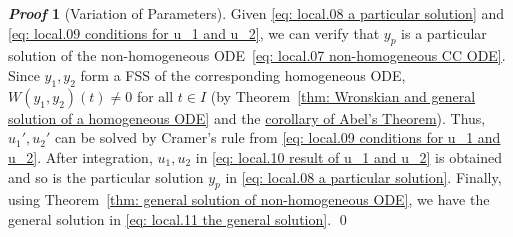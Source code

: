 \documentclass[10pt,UTF8]{article}
\theoremstyle{definition}
\newtheorem{definition inner}{Definition}[section]
\theoremstyle{definition}
\newtheorem{theorem inner}{Theorem}[section]
\theoremstyle{definition}
\newtheorem*{proof inner}{\textit{Proof}}
\renewenvironment{proof}[1][]
{
\begin{proof inner}[#1]\hfill\par}
  {\qed\vphantom{.}
\end{proof inner}}
\theoremstyle{plain}
\newtheorem{tip inner}{Tip}[section]
\theoremstyle{remark}
\begin{document}
\begin{proof}[Variation of Parameters]
  Given \cref{eq: local.08 a particular solution} and
  \cref{eq: local.09 conditions for u_1 and u_2},
  we can verify that \(y_p\) is a particular solution of
  the non-homogeneous ODE~\ref{eq: local.07 non-homogeneous CC ODE}\@.
  Since \(y_1, y_2\) form a FSS of the corresponding homogeneous ODE,
  \(W(y_1, y_2)(t) \neq 0\) for all \(t \in I\)
  (by Theorem~\ref{thm: Wronskian and general solution of a homogeneous ODE}
  and the \hyperref[thm: Abel's Theorem]{corollary of Abel's Theorem}).
  Thus, \(u_1', u_2'\) can be solved by Cramer's rule from
  \cref{eq: local.09 conditions for u_1 and u_2}.
  After integration, \(u_1, u_2\) in \cref{eq: local.10 result of u_1 and u_2}
  is obtained and so is the particular solution \(y_p\) in
  \cref{eq: local.08 a particular solution}.
  Finally, using Theorem~\ref{thm: general solution of non-homogeneous ODE},
  we have the general solution in \cref{eq: local.11 the general solution}.
\end{proof}
\end{document}
